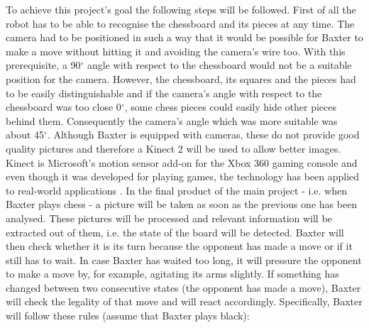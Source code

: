 \documentclass{l4proj}
\begin{document}
To achieve this project's goal the following steps will be followed. First of all the robot has to be able to recognise the chessboard and its pieces at any time. The camera had to be positioned in such a way that it would be possible for Baxter to make a move without hitting it and avoiding the camera's wire too. With this prerequisite, a 90$^{\circ}$ angle with respect to the chessboard would not be a suitable position for the camera. However, the chessboard, its squares and the pieces had to be easily distinguishable and if the camera's angle with respect to the chessboard was too close 0$^{\circ}$, some chess pieces could easily hide other pieces behind them. Consequently the camera's angle which was more suitable was about 45$^{\circ}$. Although Baxter is equipped with cameras, these do not provide good quality pictures and therefore a Kinect 2 will be used to allow better images. Kinect is Microsoft's motion sensor add-on for the Xbox 360 gaming console and even though it was developed for playing games, the technology has been applied to real-world applications \cite{Kinect}. In the final product of the main project - i.e. when Baxter plays chess - a picture will be taken as soon as the previous one has been analysed. These pictures will be processed and relevant information will be extracted out of them, i.e. the state of the board will be detected. Baxter will then check whether it is its turn because the opponent has made a move or if it still has to wait. In case Baxter has waited too long, it will pressure the opponent to make a move by, for example, agitating its arms slightly. If something has changed between two consecutive states (the opponent has made a move), Baxter will check the legality of that move and will react accordingly. Specifically, Baxter will follow these rules (assume that Baxter plays black):
\end{document}
